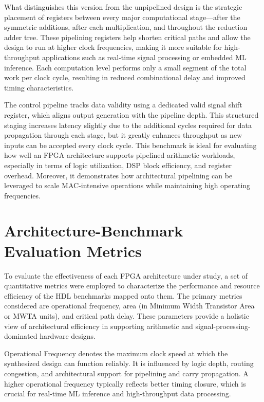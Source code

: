 What distinguishes this version from the unpipelined design is the strategic placement of registers between every major computational stage—after the symmetric additions, after each multiplication, and throughout the reduction adder tree. These pipelining registers help shorten critical paths and allow the design to run at higher clock frequencies, making it more suitable for high-throughput applications such as real-time signal processing or embedded ML inference. Each computation level performs only a small segment of the total work per clock cycle, resulting in reduced combinational delay and improved timing characteristics.

The control pipeline tracks data validity using a dedicated valid signal shift register, which aligns output generation with the pipeline depth. This structured staging increases latency slightly due to the additional cycles required for data propagation through each stage, but it greatly enhances throughput as new inputs can be accepted every clock cycle. This benchmark is ideal for evaluating how well an FPGA architecture supports pipelined arithmetic workloads, especially in terms of logic utilization, DSP block efficiency, and register overhead. Moreover, it demonstrates how architectural pipelining can be leveraged to scale MAC-intensive operations while maintaining high operating frequencies.


\section{Architecture-Benchmark Evaluation Metrics}
To evaluate the effectiveness of each FPGA architecture under study, a set of quantitative metrics were employed to characterize the performance and resource efficiency of the HDL benchmarks mapped onto them. The primary metrics considered are operational frequency, area (in Minimum Width Transistor Area or MWTA units), and critical path delay. These parameters provide a holistic view of architectural efficiency in supporting arithmetic and signal-processing-dominated hardware designs.

Operational Frequency denotes the maximum clock speed at which the synthesized design can function reliably. It is influenced by logic depth, routing congestion, and architectural support for pipelining and carry propagation. A higher operational frequency typically reflects better timing closure, which is crucial for real-time ML inference and high-throughput data processing.

